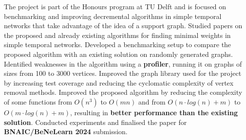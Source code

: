     \vspace{6pt}
    \small{\newline{} The project is part of the Honours program at TU Delft and is focused on benchmarking and improving decremental algorithms in simple temporal networks that take advantage of the idea of a support graph.}
    \vspace{-4pt}
        \resumeItemListStart
            \subItemOfItem
            {Studied papers on the proposed and already existing algorithms for finding minimal weights in simple temporal networks.}
            \subItemOfItem
            {Developed a benchmarking setup to compare the proposed algorithm with an existing solution on randomly generated graphs.}
            \subItemOfItem
            {Identified weaknesses in the algorithm using a \textbf{profiler}, running it on graphs of sizes from 100 to 3000 vertices.}
            \subItemOfItem
            {Improved the graph library used for the project by increasing test coverage and reducing the cyclomatic complexity of vertex removal methods.}
            \subItemOfItem
            {Improved the proposed algorithm by reducing the complexity of some functions from $O(n^3)$ to $O(mn)$ and from $O(n\cdot log(n) + m)$ to $O(m\cdot log(n) + m)$, resulting in \textbf{better performance than the existing solution}.}
            \subItemOfItem
            {Conducted experiments and finalised the paper for \textbf{BNAIC/BeNeLearn 2024} submission.}
        \resumeItemListEnd